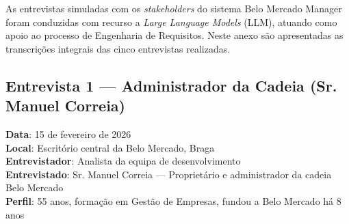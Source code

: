 \documentclass[a4paper,12pt]{scrreprt}
\begin{document}
\newcommand{\sigACID}{\hyperlink{sigla:acid}{ACID}}
\newcommand{\sigADR}{\hyperlink{sigla:adr}{ADR}}
\newcommand{\sigAPI}{\hyperlink{sigla:api}{API}}
\newcommand{\sigBD}{\hyperlink{sigla:bd}{BD}}
\newcommand{\sigCSV}{\hyperlink{sigla:csv}{CSV}}
\newcommand{\sigEAN}{\hyperlink{sigla:ean}{EAN}}
\newcommand{\sigETL}{\hyperlink{sigla:etl}{ETL}}
\newcommand{\sigHTTPS}{\hyperlink{sigla:https}{HTTPS}}
\newcommand{\sigIVA}{\hyperlink{sigla:iva}{IVA}}
\newcommand{\sigJWT}{\hyperlink{sigla:jwt}{JWT}}
\newcommand{\sigKPI}{\hyperlink{sigla:kpi}{KPI}}
\newcommand{\sigLEI}{\hyperlink{sigla:lei}{LEI}}
\newcommand{\sigLIIV}{\hyperlink{sigla:li4}{LI4}}
\newcommand{\sigLLM}{\hyperlink{sigla:llm}{LLM}}
\newcommand{\sigNIF}{\hyperlink{sigla:nif}{NIF}}
\newcommand{\sigPDF}{\hyperlink{sigla:pdf}{PDF}}
\newcommand{\sigPOS}{\hyperlink{sigla:pos}{POS}}
\newcommand{\sigRGPD}{\hyperlink{sigla:rgpd}{RGPD}}
\newcommand{\sigSRS}{\hyperlink{sigla:srs}{SRS}}
\newcommand{\sigTLS}{\hyperlink{sigla:tls}{TLS}}
\newcommand{\sigUC}{\hyperlink{sigla:uc}{UC}}
\newcommand{\sigUI}{\hyperlink{sigla:ui}{UI}}
\newcommand{\sigUML}{\hyperlink{sigla:uml}{UML}}
\newcommand{\sigUX}{\hyperlink{sigla:ux}{UX}}

\printnomenclature




As entrevistas simuladas com os \textit{stakeholders} do sistema Belo Mercado Manager foram conduzidas com recurso a \textit{Large Language Models} (LLM), atuando como apoio ao processo de Engenharia de Requisitos. Neste anexo são apresentadas as transcrições integrais das cinco entrevistas realizadas.

\subsection*{Entrevista 1 --- Administrador da Cadeia (Sr. Manuel Correia)}
\textbf{Data}: 15 de fevereiro de 2026\\
\textbf{Local}: Escritório central da Belo Mercado, Braga\\
\textbf{Entrevistador}: Analista da equipa de desenvolvimento\\
\textbf{Entrevistado}: Sr. Manuel Correia --- Proprietário e administrador da cadeia Belo Mercado\\
\textbf{Perfil}: 55 anos, formação em Gestão de Empresas, fundou a Belo Mercado há 8 anos
\end{document}
